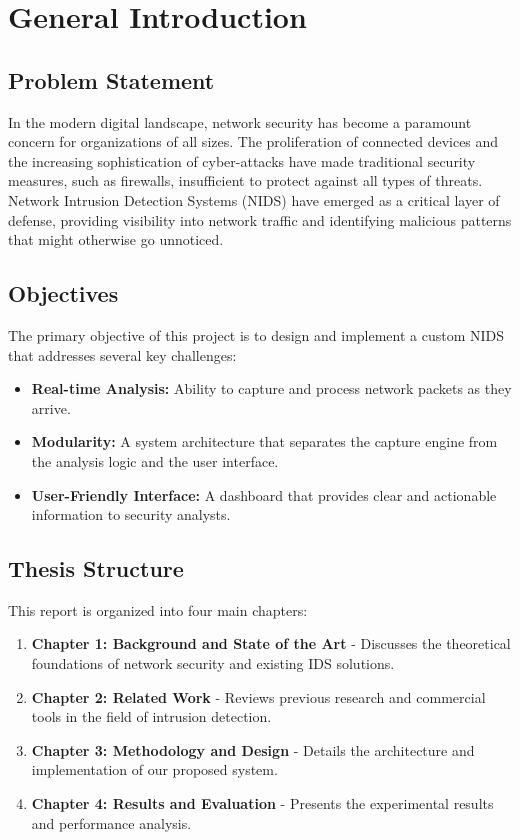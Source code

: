 \chapter{General Introduction}
\label{chap:intro}

\section{Problem Statement}
In the modern digital landscape, network security has become a paramount concern for organizations of all sizes. The proliferation of connected devices and the increasing sophistication of cyber-attacks have made traditional security measures, such as firewalls, insufficient to protect against all types of threats. Network Intrusion Detection Systems (NIDS) have emerged as a critical layer of defense, providing visibility into network traffic and identifying malicious patterns that might otherwise go unnoticed.

\section{Objectives}
The primary objective of this project is to design and implement a custom NIDS that addresses several key challenges:
\begin{itemize}
    \item \textbf{Real-time Analysis:} Ability to capture and process network packets as they arrive.
    \item \textbf{Modularity:} A system architecture that separates the capture engine from the analysis logic and the user interface.
    \item \textbf{User-Friendly Interface:} A dashboard that provides clear and actionable information to security analysts.
\end{itemize}

\section{Thesis Structure}
This report is organized into four main chapters:
\begin{enumerate}
    \item \textbf{Chapter 1: Background and State of the Art} - Discusses the theoretical foundations of network security and existing IDS solutions.
    \item \textbf{Chapter 2: Related Work} - Reviews previous research and commercial tools in the field of intrusion detection.
    \item \textbf{Chapter 3: Methodology and Design} - Details the architecture and implementation of our proposed system.
    \item \textbf{Chapter 4: Results and Evaluation} - Presents the experimental results and performance analysis.
\end{enumerate}
